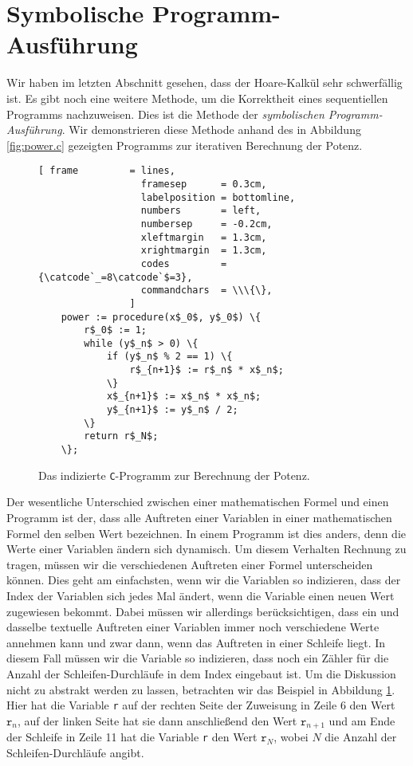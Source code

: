 \section{Symbolische Programm-Ausf\"uhrung}
Wir haben im letzten Abschnitt gesehen, dass der Hoare-Kalk\"ul sehr schwerf\"allig ist.  Es
gibt noch eine weitere Methode, um die Korrektheit eines sequentiellen Programms
nachzuweisen.  Dies ist die Methode der \emph{symbolischen Programm-Ausf\"uhrung}.  Wir
demonstrieren diese Methode anhand des in Abbildung \ref{fig:power.c} gezeigten
Programms zur iterativen Berechnung der Potenz.


\begin{figure}[!h]
\centering
\begin{Verbatim}[ frame         = lines, 
                  framesep      = 0.3cm, 
                  labelposition = bottomline,
                  numbers       = left,
                  numbersep     = -0.2cm,
                  xleftmargin   = 1.3cm,
                  xrightmargin  = 1.3cm,
                  codes         = {\catcode`_=8\catcode`$=3},
                  commandchars  = \\\{\},
                ]
    power := procedure(x$_0$, y$_0$) \{
        r$_0$ := 1;
        while (y$_n$ > 0) \{
            if (y$_n$ % 2 == 1) \{
                r$_{n+1}$ := r$_n$ * x$_n$;
            \} 
            x$_{n+1}$ := x$_n$ * x$_n$;
            y$_{n+1}$ := y$_n$ / 2;            
        \} 
        return r$_N$;
    \};
\end{Verbatim}
\vspace*{-0.3cm}
\caption{Das indizierte \texttt{C}-Programm zur Berechnung der Potenz.}
\label{fig:PowerIterative.iter}
\end{figure} %


Der wesentliche Unterschied zwischen einer mathematischen Formel und einen Programm ist
der, dass alle Auftreten einer Variablen in einer mathematischen Formel den selben Wert
bezeichnen.  In einem Programm ist dies anders, denn die Werte einer Variablen \"andern sich
dynamisch.  Um diesem  Verhalten Rechnung zu tragen, m\"ussen wir die verschiedenen
Auftreten einer Formel unterscheiden k\"onnen.  Dies geht am einfachsten, wenn wir die
Variablen so indizieren, dass der Index der Variablen sich jedes Mal \"andert, wenn die
Variable einen neuen Wert zugewiesen bekommt. 
Dabei m\"ussen wir allerdings ber\"ucksichtigen, dass ein und dasselbe textuelle
Auftreten einer Variablen immer noch verschiedene Werte annehmen kann und zwar dann, wenn 
das Auftreten in einer Schleife liegt.  In diesem Fall m\"ussen wir die Variable so
indizieren, dass noch ein Z\"ahler f\"ur die Anzahl der Schleifen-Durchl\"aufe in dem Index
eingebaut ist.  Um die Diskussion nicht zu abstrakt werden zu lassen, betrachten wir das
Beispiel in Abbildung \ref{fig:PowerIterative.iter}.  Hier hat die Variable \texttt{r} auf
der rechten Seite der Zuweisung in Zeile 6 den Wert $\texttt{r}_n$, auf der linken Seite
hat sie dann anschlie{\ss}end den Wert $\texttt{r}_{n+1}$ und am Ende der Schleife in Zeile 11 hat die
Variable \texttt{r} den Wert $\texttt{r}_N$, wobei $N$ die Anzahl der Schleifen-Durchl\"aufe
angibt.

